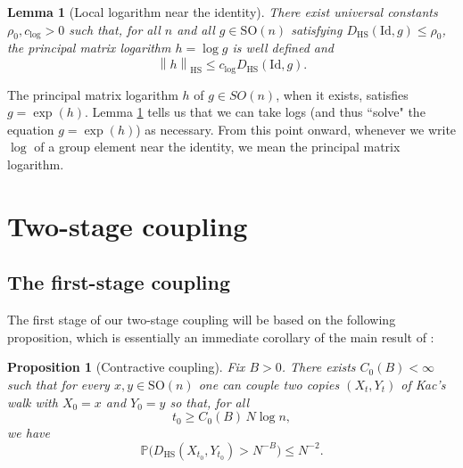\documentclass[11pt, reqno]{amsart}
\numberwithin{equation}{section}
\newtheorem{proposition}{Proposition}
\newtheorem{lemma}{Lemma}
\theoremstyle{remark}
\newcommand{\Prob}{\mathbb{P}}
\newcommand{\1}{\mathbf{1}}
\newcommand{\SO}{\mathrm{SO}}
\newcommand{\Id}{\mathrm{Id}}
\newcommand{\HS}{\mathrm{HS}}
\newcommand{\norm}[1]{\left\lVert #1\right\rVert}
\begin{document}
\begin{lemma}[Local logarithm near the identity]
\label{lem:local-log}
There exist universal constants $\rho_0,c_{\log}>0$ such that, for all $n$ and all $g\in \SO(n)$ satisfying
$D_{\HS}(\Id,g)\le \rho_0$, the principal matrix logarithm $h=\log g$ is well defined and
\[
\norm{h}_{\HS}\le c_{\log}D_{\HS}(\Id,g).
\]
\end{lemma}

The principal matrix logarithm $h$ of $g \in SO(n)$, when it exists, satisfies $g = \exp(h)$. Lemma \ref{lem:local-log} tells us that we can take logs (and thus ``solve" the equation $g = \exp(h)$) as necessary. From this point onward, whenever we write $\log$ of a group element near the identity, we mean the principal matrix logarithm.

\section{Two-stage coupling}
\subsection{The first-stage coupling}

The first stage of our two-stage coupling will be based on the following proposition, which is essentially an immediate corollary of the main result of \cite{Oliveira}:

\begin{proposition}[Contractive coupling]
\label{prop:scaffold}
Fix $B>0$.
There exists $C_0(B)<\infty$ such that for every $x,y\in \SO(n)$ one can couple two copies
$(X_t,Y_t)$ of Kac's walk with $X_0=x$ and $Y_0=y$ so that, for all
\begin{equation}
\label{eq:t0-def}
t_0 \geq C_0(B)\,N\log n,
\end{equation}
we have
\begin{equation}
\label{eq:scaffold-bound}
\Prob\!\bigl(D_{\HS}(X_{t_0},Y_{t_0})>N^{-B}\bigr)\le N^{-2}.
\end{equation}
\end{proposition}
\end{document}
